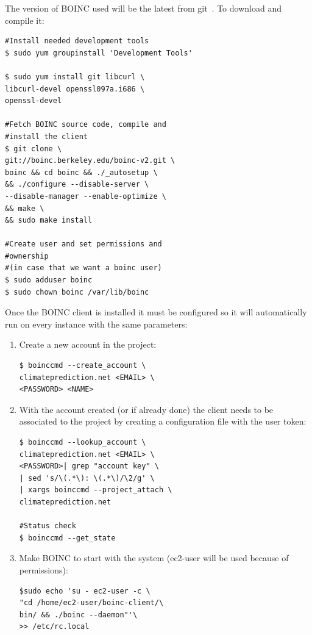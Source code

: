 \documentclass[journal abbreviation, manuscript]{copernicus}
\begin{document}
The version of BOINC used will be the latest from git~\citep{git}. To download and compile it:

\begin{verbatim}
#Install needed development tools
$ sudo yum groupinstall 'Development Tools'

$ sudo yum install git libcurl \
libcurl-devel openssl097a.i686 \
openssl-devel

#Fetch BOINC source code, compile and
#install the client
$ git clone \
git://boinc.berkeley.edu/boinc-v2.git \
boinc && cd boinc && ./_autosetup \
&& ./configure --disable-server \
--disable-manager --enable-optimize \
&& make \
&& sudo make install

#Create user and set permissions and
#ownership
#(in case that we want a boinc user)
$ sudo adduser boinc
$ sudo chown boinc /var/lib/boinc
\end{verbatim}

Once the BOINC client is installed it must be configured so it will automatically run on every instance
with the same parameters:\\

\begin{enumerate}

 \item  Create a new account in the project:

\begin{verbatim}
$ boinccmd --create_account \
climateprediction.net <EMAIL> \
<PASSWORD> <NAME>
\end{verbatim}


\item With the account created (or if already done) the client needs to be associated to the project by
creating a configuration file with the user token:

\begin{verbatim}
$ boinccmd --lookup_account \
climateprediction.net <EMAIL> \
<PASSWORD>| grep "account key" \
| sed 's/\(.*\): \(.*\)/\2/g' \
| xargs boinccmd --project_attach \
climateprediction.net

#Status check
$ boinccmd --get_state
\end{verbatim}

\item Make BOINC to start with the system (ec2-user will be used because of permissions):

\begin{verbatim}
$sudo echo 'su - ec2-user -c \
"cd /home/ec2-user/boinc-client/\
bin/ && ./boinc --daemon"'\
>> /etc/rc.local
\end{verbatim}

\end{enumerate}
\end{document}
